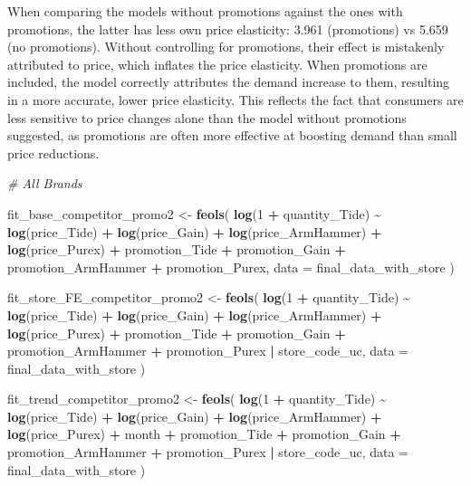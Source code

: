 \documentclass[
]{article}
\newenvironment{Shaded}{\begin{snugshade}}{\end{snugshade}}
\newcommand{\AttributeTok}[1]{\textcolor[rgb]{0.13,0.29,0.53}{#1}}
\newcommand{\CommentTok}[1]{\textcolor[rgb]{0.56,0.35,0.01}{\textit{#1}}}
\newcommand{\DecValTok}[1]{\textcolor[rgb]{0.00,0.00,0.81}{#1}}
\newcommand{\FunctionTok}[1]{\textcolor[rgb]{0.13,0.29,0.53}{\textbf{#1}}}
\newcommand{\NormalTok}[1]{#1}
\newcommand{\OtherTok}[1]{\textcolor[rgb]{0.56,0.35,0.01}{#1}}
\newcommand{\SpecialCharTok}[1]{\textcolor[rgb]{0.81,0.36,0.00}{\textbf{#1}}}
\begin{document}
When comparing the models without promotions against the ones with
promotions, the latter has less own price elasticity: 3.961 (promotions)
vs 5.659 (no promotions). Without controlling for promotions, their
effect is mistakenly attributed to price, which inflates the price
elasticity. When promotions are included, the model correctly attributes
the demand increase to them, resulting in a more accurate, lower price
elasticity. This reflects the fact that consumers are less sensitive to
price changes alone than the model without promotions suggested, as
promotions are often more effective at boosting demand than small price
reductions.

\begin{Shaded}
\begin{Highlighting}[]
\CommentTok{\# All Brands}

\NormalTok{fit\_base\_competitor\_promo2 }\OtherTok{\textless{}{-}} \FunctionTok{feols}\NormalTok{(}
  \FunctionTok{log}\NormalTok{(}\DecValTok{1} \SpecialCharTok{+}\NormalTok{ quantity\_Tide) }\SpecialCharTok{\textasciitilde{}} \FunctionTok{log}\NormalTok{(price\_Tide) }\SpecialCharTok{+} \FunctionTok{log}\NormalTok{(price\_Gain) }\SpecialCharTok{+} 
    \FunctionTok{log}\NormalTok{(price\_ArmHammer) }\SpecialCharTok{+} \FunctionTok{log}\NormalTok{(price\_Purex) }\SpecialCharTok{+}\NormalTok{ promotion\_Tide }\SpecialCharTok{+} 
\NormalTok{    promotion\_Gain }\SpecialCharTok{+}\NormalTok{ promotion\_ArmHammer }\SpecialCharTok{+}\NormalTok{ promotion\_Purex, }
  \AttributeTok{data =}\NormalTok{ final\_data\_with\_store}
\NormalTok{)}

\NormalTok{fit\_store\_FE\_competitor\_promo2 }\OtherTok{\textless{}{-}} \FunctionTok{feols}\NormalTok{(}
  \FunctionTok{log}\NormalTok{(}\DecValTok{1} \SpecialCharTok{+}\NormalTok{ quantity\_Tide) }\SpecialCharTok{\textasciitilde{}} \FunctionTok{log}\NormalTok{(price\_Tide) }\SpecialCharTok{+} \FunctionTok{log}\NormalTok{(price\_Gain) }\SpecialCharTok{+}
    \FunctionTok{log}\NormalTok{(price\_ArmHammer) }\SpecialCharTok{+} \FunctionTok{log}\NormalTok{(price\_Purex) }\SpecialCharTok{+}\NormalTok{ promotion\_Tide }\SpecialCharTok{+} 
\NormalTok{    promotion\_Gain }\SpecialCharTok{+}\NormalTok{ promotion\_ArmHammer }\SpecialCharTok{+}\NormalTok{ promotion\_Purex }\SpecialCharTok{|}\NormalTok{ store\_code\_uc, }
  \AttributeTok{data =}\NormalTok{ final\_data\_with\_store}
\NormalTok{)}

\NormalTok{fit\_trend\_competitor\_promo2 }\OtherTok{\textless{}{-}} \FunctionTok{feols}\NormalTok{(}
  \FunctionTok{log}\NormalTok{(}\DecValTok{1} \SpecialCharTok{+}\NormalTok{ quantity\_Tide) }\SpecialCharTok{\textasciitilde{}} \FunctionTok{log}\NormalTok{(price\_Tide) }\SpecialCharTok{+} \FunctionTok{log}\NormalTok{(price\_Gain) }\SpecialCharTok{+} 
    \FunctionTok{log}\NormalTok{(price\_ArmHammer) }\SpecialCharTok{+} \FunctionTok{log}\NormalTok{(price\_Purex) }\SpecialCharTok{+}\NormalTok{ month }\SpecialCharTok{+} 
\NormalTok{    promotion\_Tide }\SpecialCharTok{+}\NormalTok{ promotion\_Gain }\SpecialCharTok{+}\NormalTok{ promotion\_ArmHammer }\SpecialCharTok{+}\NormalTok{ promotion\_Purex }\SpecialCharTok{|} 
\NormalTok{    store\_code\_uc, }\AttributeTok{data =}\NormalTok{ final\_data\_with\_store}
\NormalTok{)}


\end{Highlighting}
\end{Shaded}
\end{document}
